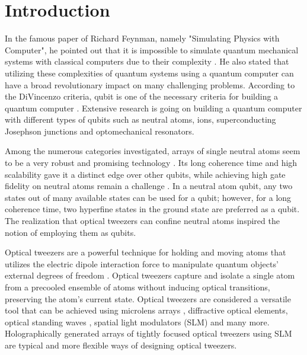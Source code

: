 \section{Introduction} 
\label{sec:intro}
\onehalfspacing
\noindent
In the famous paper of Richard Feynman, namely "Simulating Physics with Computer", he pointed out that it is impossible to simulate quantum mechanical systems with classical computers due to their complexity \cite{feynman1982simulating}. He also stated that utilizing these complexities of quantum systems using a quantum computer can have a broad revolutionary impact on many challenging problems. According to the DiVincenzo criteria, qubit is one of the necessary criteria for building a quantum computer \cite{divincenzo2000physical}. Extensive research is going on building a quantum computer with different types of qubits such as neutral atoms, ions, superconducting Josephson junctions and optomechanical resonators.

Among the numerous categories investigated, arrays of single neutral atoms seem to be a very robust and promising technology \cite{saffman2016quantum}. Its long coherence time and high scalability gave it a distinct edge over other qubits, while achieving high gate fidelity on neutral atoms remain a challenge \cite{xia2015randomized}. In a neutral atom qubit, any two states out of many available states can be used for a qubit; however, for a long coherence time, two hyperfine states in the ground state are preferred as a qubit. The realization that optical tweezers can confine neutral atoms inspired the notion of employing them as qubits.  

Optical tweezers are a powerful technique for holding and moving atoms that utilizes the electric dipole interaction force to manipulate quantum objects' external degrees of freedom \cite{samoylenko2020single, nogrette2014single, Lee:16}. Optical tweezers capture and isolate a single atom from a precooled ensemble of atoms without inducing optical transitions, preserving the atom's current state. Optical tweezers are considered a versatile tool that can be achieved using microlens arrays \cite{schlosser2011scalable}, diffractive optical elements, optical standing waves \cite{dammann1971high}, spatial light modulators (SLM) \cite{nogrette2014single} and many more. Holographically generated arrays of tightly focused optical tweezers using SLM are typical and more flexible ways of designing optical tweezers.


